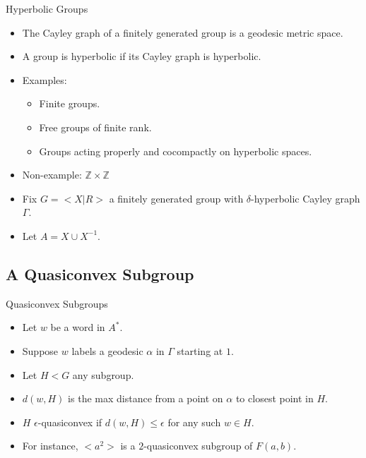 \documentclass{article}
\begin{document}
\begin{frame}{Hyperbolic Groups}

  \begin{itemize}
  \item The Cayley graph of a finitely generated group is a geodesic metric space.
  \item A group is hyperbolic if its Cayley graph is hyperbolic.
  \item Examples:
  \begin{itemize}
    \pause
    \item Finite groups.
    \pause
    \item Free groups of finite rank.
    \pause
    \item Groups acting properly and cocompactly on hyperbolic spaces.
  \end{itemize}
  \pause
  \item Non-example: $\mathbb{Z}\times\mathbb{Z}$
  \pause
  \item Fix $G = <\!\!X | R\!\!>$ a finitely generated group with $\delta$-hyperbolic Cayley graph $\Gamma$.
  \item Let $A = X \cup X^{-1}$.
  \end{itemize}

\end{frame}


\subsection{A Quasiconvex Subgroup}

\begin{frame}{Quasiconvex Subgroups}
  \begin{itemize}
    \item Let $w$ be a word in $A^*$.
	\item Suppose $w$ labels a geodesic $\alpha$ in $\Gamma$ starting at $1$.
	\item Let $H < G$ any subgroup.
	\pause
	\item $d(w, H)$ is the max distance from a point on $\alpha$ to closest point in $H$.
  	\begin{figure}
	
	\end{figure}
	\pause
	\item $H$ $\epsilon$-quasiconvex if $d(w, H) \le \epsilon$ for any such $w \in H$.
	\pause
	\item For instance, $<\!\!a^2\!\!>$ is a $2$-quasiconvex subgroup of $F(a, b)$.
  \end{itemize}
\end{frame}
\end{document}
